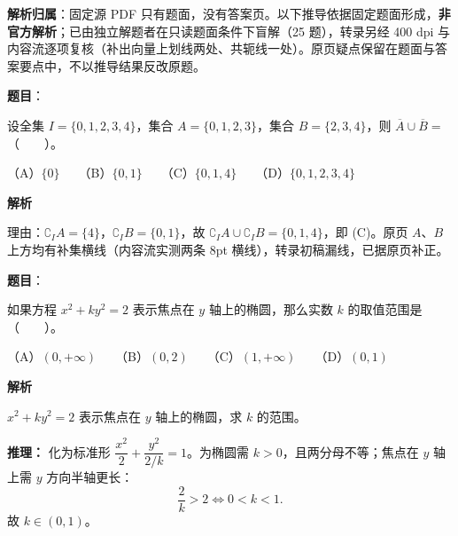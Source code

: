 

\begin{gknotice}
\textbf{解析归属}：固定源 PDF 只有题面，没有答案页。以下推导依据固定题面形成，\textbf{非官方解析}；已由独立解题者在只读题面条件下盲解（25 题），转录另经 400 dpi 与内容流逐项复核（补出向量上划线两处、共轭线一处）。原页疑点保留在题面与答案要点中，不以推导结果反改原题。
\end{gknotice}

\begin{answer}

\textbf{题目}：

设全集 $I=\{0,1,2,3,4\}$，集合 $A=\{0,1,2,3\}$，集合 $B=\{2,3,4\}$，则 $\overline{A}\cup\overline{B}=$\mbox{（　　）}。

（A）$\{0\}$　　（B）$\{0,1\}$　　（C）$\{0,1,4\}$　　（D）$\{0,1,2,3,4\}$

\textbf{解析}

理由：\(\complement_I A=\{4\}\)，\(\complement_I B=\{0,1\}\)，故 \(\complement_I A\cup\complement_I B=\{0,1,4\}\)，即 (C)。原页 \(A\)、\(B\) 上方均有补集横线（内容流实测两条 8pt 横线），转录初稿漏线，已据原页补正。


\end{answer}
\begin{answer}

\textbf{题目}：

如果方程 $x^2+ky^2=2$ 表示焦点在 $y$ 轴上的椭圆，那么实数 $k$ 的取值范围是\mbox{（　　）}。

（A）$(0,+\infty)$　　（B）$(0,2)$　　（C）$(1,+\infty)$　　（D）$(0,1)$

\textbf{解析}

$x^2+ky^2=2$ 表示焦点在 $y$ 轴上的椭圆，求 $k$ 的范围。

\textbf{推理：} 化为标准形 $\dfrac{x^2}{2}+\dfrac{y^2}{2/k}=1$。为椭圆需 $k>0$，且两分母不等；焦点在 $y$ 轴上需 $y$ 方向半轴更长：
\nopagebreak[4]
\[\frac{2}{k}>2\iff 0<k<1.\]
故 $k\in(0,1)$。


\end{answer}
